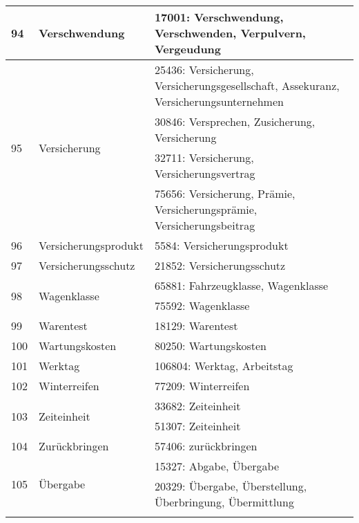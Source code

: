 \begin{longtable}{|m{1cm}|m{4.5cm}|m{7.5cm}|}
	\hline
	94 & Verschwendung & 17001: Verschwendung, Verschwenden, Verpulvern, Vergeudung\\
	\hline
	\multirow{4}{*}{95} & \multirow{4}{*}{Versicherung} & 25436: Versicherung, Versicherungsgesellschaft, Assekuranz, Versicherungsunternehmen\\
	& & 30846: Versprechen, Zusicherung, Versicherung\\
	\hline
	& & 32711: Versicherung, Versicherungsvertrag\\
	\hline
	& & 75656: Versicherung, Prämie, Versicherungsprämie, Versicherungsbeitrag\\
	\hline
	96 & Versicherungsprodukt & 5584: Versicherungsprodukt\\
	\hline
	97 & Versicherungsschutz & 21852: Versicherungsschutz\\
	\hline
	\multirow{2}{*}{98} & \multirow{2}{*}{Wagenklasse} & 65881: Fahrzeugklasse, Wagenklasse\\
	& & 75592: Wagenklasse\\
	\hline
	99 & Warentest & 18129: Warentest\\
	\hline
	100 & Wartungskosten & 80250: Wartungskosten\\
	\hline
	101 & Werktag & 106804: Werktag, Arbeitstag\\
	\hline
	102 & Winterreifen & 77209: Winterreifen\\
	\hline
	\multirow{2}{*}{103} & \multirow{2}{*}{Zeiteinheit} & 33682: Zeiteinheit\\
	& & 51307: Zeiteinheit\\
	\hline
	104 & Zurückbringen & 57406: zurückbringen\\
	\hline
	\multirow{2}{*}{105} & \multirow{2}{*}{Übergabe} & 15327: Abgabe, Übergabe\\
	& & 20329: Übergabe, Überstellung, Überbringung, Übermittlung\\
	\lasthline
\end{longtable}
%
